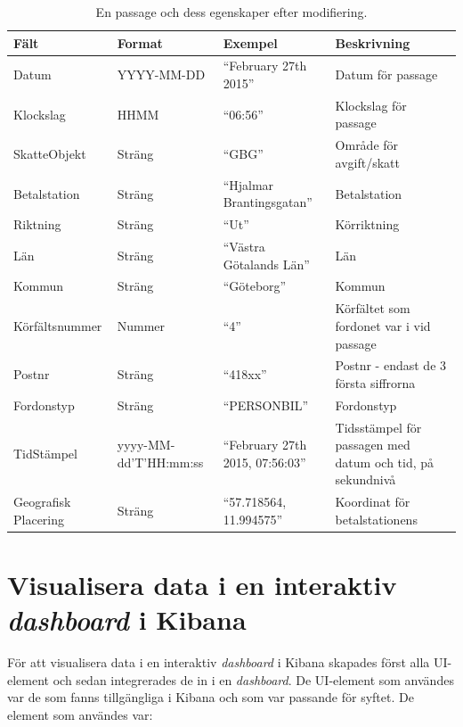\documentclass[12pt]{kththesis}
\begin{document}
\begin{table}[h!]
  \begin{center}
    \caption{En passage och dess egenskaper efter modifiering.}
    \label{tab:table1}
    \begin{tabular}{|p{3cm}|p{3cm}|p{3cm}|p{3cm}|}
         \hline
      \textbf{Fält} & \textbf{Format} & \textbf{Exempel} & \textbf{Beskrivning}\\
      \hline
      Datum & YYYY-MM-DD & “February 27th 2015” & Datum för passage\\ %
        \hline
      Klockslag & HHMM& “06:56” & Klockslag för passage\\ %
        \hline
      SkatteObjekt & Sträng & “GBG”
 & Område för avgift/skatt\\ %
        \hline
      Betalstation & Sträng & “Hjalmar Brantingsgatan” & Betalstation\\ %
        \hline
      Riktning & Sträng & “Ut” & Körriktning\\ %
        \hline
      Län & Sträng & “Västra Götalands Län” & Län\\ %
        \hline
      Kommun & Sträng & “Göteborg” & Kommun\\ %
        \hline
      Körfältsnummer & Nummer & “4” &  Körfältet som fordonet var i vid passage\\ %
        \hline
          Postnr & Sträng & “418xx”
 & Postnr - endast de 3 första siffrorna\\ %
        \hline
          Fordonstyp & Sträng & “PERSONBIL” & Fordonstyp\\ %
        \hline
          TidStämpel & yyyy-MM-dd'T'HH:mm:ss
 & “February 27th 2015, 07:56:03” & Tidsstämpel för passagen med datum och tid, på sekundnivå 
\\ %
        \hline
Geografisk Placering & Sträng & “57.718564, 11.994575” & 
Koordinat för betalstationens 
\\ %
        \hline
    \end{tabular}
  \end{center}
\end{table}


\section{Visualisera data i en interaktiv \textit{dashboard} i Kibana}

För att visualisera data i en interaktiv \textit{dashboard} i Kibana skapades först alla UI-element och sedan integrerades de in i en \textit{dashboard}. De UI-element som användes var de som fanns tillgängliga i Kibana och som var passande för syftet. De element som användes var:
\end{document}
